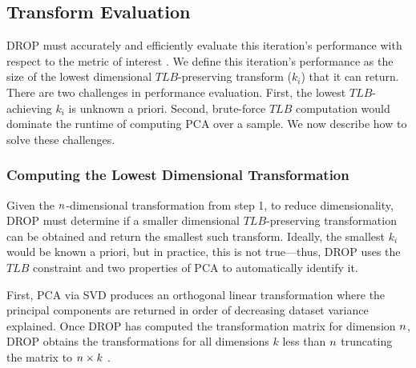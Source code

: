 \subsection{Transform Evaluation}
\label{subsec:teval}
DROP must accurately and efficiently evaluate this iteration's performance with respect to the metric of interest . 
We define this iteration's performance as the size of the lowest dimensional $TLB$-preserving transform ($k_i$) that it can return. 
There are two challenges in performance evaluation.
First, the lowest $TLB$-achieving $k_i$ is unknown a priori. 
Second, brute-force $TLB$ computation would dominate the runtime of computing PCA over a sample. 
We now describe how to solve these challenges.

\subsubsection{Computing the Lowest Dimensional Transformation}

Given the ${\color{black}n}$-dimensional transformation from step 1, to reduce dimensionality, DROP must determine if a smaller dimensional $TLB$-preserving transformation can be obtained and return the smallest such transform. 
Ideally, the smallest $k_i$ would be known a priori, but in practice, this is not true---thus, DROP uses the $TLB$ constraint and two properties of PCA to automatically identify it.

First, PCA via SVD produces an orthogonal linear transformation where the principal components  are returned in order of decreasing dataset variance explained.
Once DROP has computed the transformation matrix for dimension ${\color{black}n}$, DROP obtains the transformations for all dimensions $k$ less than ${\color{black}n}$ truncating the matrix to ${\color{black}n} \times k$ .

